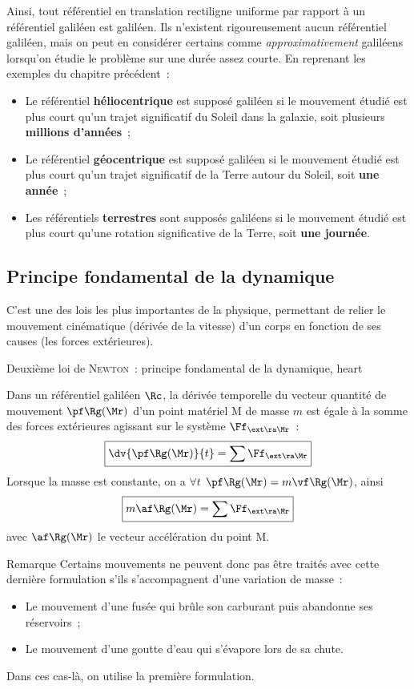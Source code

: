 \documentclass[../main/main.tex]{subfiles}
\begin{document}
Ainsi, tout référentiel en translation rectiligne uniforme par rapport à un
référentiel galiléen est galiléen. Ils n'existent rigoureusement aucun
référentiel galiléen, mais on peut en considérer certains comme
\textit{approximativement} galiléens lorsqu'on étudie le problème sur une durée
assez courte. En reprenant les exemples du chapitre précédent~: \bigbreak
\begin{itemize}
    \item Le référentiel \textbf{héliocentrique} est supposé galiléen si le
        mouvement étudié est plus court qu'un trajet significatif du Soleil dans
        la galaxie, soit plusieurs \textbf{millions d'années}~;
    \item Le référentiel \textbf{géocentrique} est supposé galiléen si le
        mouvement étudié est plus court qu'un trajet significatif de la Terre
        autour du Soleil, soit \textbf{une année}~;
    \item Les référentiels \textbf{terrestres} sont supposés galiléens si le
        mouvement étudié est plus court qu'une rotation significative de la
        Terre, soit \textbf{une journée}.
\end{itemize}

\subsection{Principe fondamental de la dynamique}

C'est une des lois les plus importantes de la physique, permettant de relier le
mouvement cinématique (dérivée de la vitesse) d'un corps en fonction de ses
causes (les forces extérieures).

\begin{tprop}{Deuxième loi de \textsc{Newton}~: principe fondamental de la
    dynamique, heart}

    Dans un référentiel galiléen $\Rc$, la dérivée temporelle du vecteur
    quantité de mouvement $\pf\Rg(\Mr)$ d'un point matériel M de masse $m$ est
    égale à la somme des forces extérieures agissant sur le système
    $\Ff_{\ext\ra\Mr}$~:
    \[
        \boxed{\dv{\pf\Rg(\Mr)}{t} = \sum \Ff_{\ext\ra\Mr}}
    \]
    Lorsque la masse est constante, on a $\forall t$ $\pf\Rg(\Mr) =
    m\vf\Rg(\Mr)$, ainsi
    \[
        \boxed{m\af\Rg(\Mr) = \sum \Ff_{\ext\ra\Mr}}
    \]
    avec $\af\Rg(\Mr)$ le vecteur accélération du point M.
\end{tprop}

\begin{rexem}{Remarque}
    Certains mouvements ne peuvent donc pas être traités avec cette dernière
    formulation s'ils s'accompagnent d'une variation de masse~:
    \begin{itemize}
        \item Le mouvement d'une fusée qui brûle son carburant puis abandonne
            ses réservoirs~;
        \item Le mouvement d'une goutte d'eau qui s'évapore lors de sa chute.
    \end{itemize}
    Dans ces cas-là, on utilise la première formulation.
\end{rexem}
\end{document}
